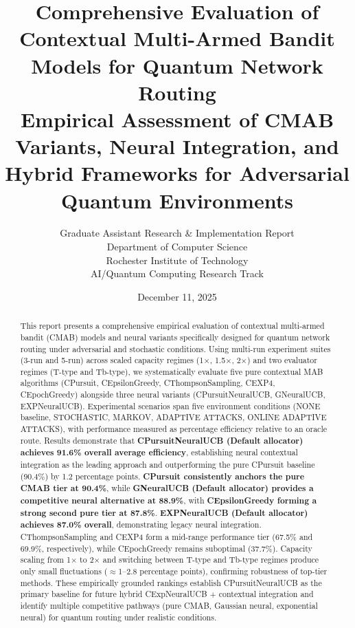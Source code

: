 \documentclass[12pt,a4paper]{article}
\title{\textbf{Comprehensive Evaluation of Contextual Multi-Armed Bandit Models for Quantum Network Routing}\\
\large{Empirical Assessment of CMAB Variants, Neural Integration, and Hybrid Frameworks for Adversarial Quantum Environments}}
\author{Graduate Assistant Research \& Implementation Report\\ 
Department of Computer Science \\ 
Rochester Institute of Technology \\ 
AI/Quantum Computing Research Track}
\date{December 11, 2025}
\newcommand{\performance}[1]{\textcolor{performancecolor}{\textbf{#1}}}
\newcommand{\legacy}[1]{\textcolor{legacycolor}{\textbf{#1}}}
\newcommand{\neural}[1]{\textcolor{neuralcolor}{\textbf{#1}}}
\begin{document}
\maketitle

\begin{abstract}
This report presents a comprehensive empirical evaluation of contextual multi-armed bandit (CMAB) models and neural variants specifically designed for quantum network routing under adversarial and stochastic conditions. Using multi-run experiment suites (3-run and 5-run) across scaled capacity regimes (1$\times$, 1.5$\times$, 2$\times$) and two evaluator regimes (T-type and Tb-type), we systematically evaluate five pure contextual MAB algorithms (CPursuit, CEpsilonGreedy, CThompsonSampling, CEXP4, CEpochGreedy) alongside three neural variants (CPursuitNeuralUCB, GNeuralUCB, EXPNeuralUCB). Experimental scenarios span five environment conditions (NONE baseline, STOCHASTIC, MARKOV, ADAPTIVE ATTACKS, ONLINE ADAPTIVE ATTACKS), with performance measured as percentage efficiency relative to an oracle route. Results demonstrate that \neural{CPursuitNeuralUCB (Default allocator) achieves 91.6\% overall average efficiency}, establishing neural contextual integration as the leading approach and outperforming the pure CPursuit baseline (90.4\%) by 1.2 percentage points. \performance{CPursuit consistently anchors the pure CMAB tier at 90.4\%}, while \neural{GNeuralUCB (Default allocator) provides a competitive neural alternative at 88.9\%}, with \performance{CEpsilonGreedy forming a strong second pure tier at 87.8\%}. \legacy{EXPNeuralUCB (Default allocator) achieves 87.0\% overall}, demonstrating legacy neural integration. CThompsonSampling and CEXP4 form a mid-range performance tier (67.5\% and 69.9\%, respectively), while CEpochGreedy remains suboptimal (37.7\%). Capacity scaling from 1$\times$ to 2$\times$ and switching between T-type and Tb-type regimes produce only small fluctuations ($\approx$1--2.8 percentage points), confirming robustness of top-tier methods. These empirically grounded rankings establish CPursuitNeuralUCB as the primary baseline for future hybrid CExpNeuralUCB + contextual integration and identify multiple competitive pathways (pure CMAB, Gaussian neural, exponential neural) for quantum routing under realistic conditions.
\end{abstract}

\newpage
{\tableofcontents}

\newpage
\end{document}
